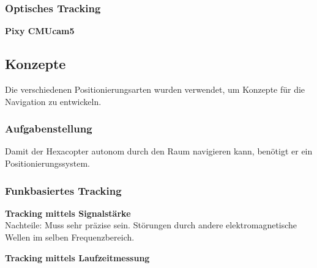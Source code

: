 \begin{itemize}
    \subsubsection{Optisches Tracking}

    \textbf{Pixy CMUcam5}\\




  \subsection{Konzepte}
  Die verschiedenen Positionierungsarten wurden verwendet, um Konzepte für die Navigation zu entwickeln.

    \subsubsection{Aufgabenstellung}
    Damit der Hexacopter autonom durch den Raum navigieren kann, benötigt er ein Positionierungssystem.

    \subsubsection{Funkbasiertes Tracking}

      \textbf{Tracking mittels Signalstärke}\\


      Nachteile:
      Muss sehr präzise sein.
      Störungen durch andere elektromagnetische Wellen im selben Frequenzbereich.



      \textbf{Tracking mittels Laufzeitmessung}\\






\end{itemize}
